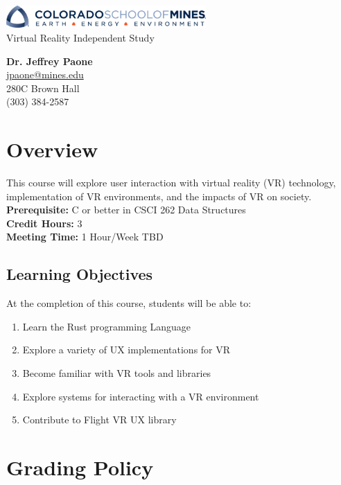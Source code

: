 \documentclass[11pt]{article}
\begin{document}
\begin{center}
    \includegraphics[width=3in]{logo-mines.png}
    \vspace{10mm}\\
    \LARGE Virtual Reality Independent Study
    \vspace{10mm}
\end{center}

\textbf{Dr. Jeffrey Paone} \\
\url{jpaone@mines.edu} \\
280C Brown Hall \\
(303) 384-2587

\section{Overview}
This course will explore user interaction with virtual reality (VR) technology,
implementation of VR environments, and the impacts of VR on society. \\

\textbf{Prerequisite:} C or better in CSCI 262 Data Structures \\
\textbf{Credit Hours:} 3 \\
\textbf{Meeting Time:} 1 Hour/Week TBD

\subsection{Learning Objectives}
At the completion of this course, students will be able to:
\begin{enumerate} \itemsep-0.4em
    \item Learn the Rust programming Language
    \item Explore a variety of UX implementations for VR
    \item Become familiar with VR tools and libraries
    \item Explore systems for interacting with a VR environment
    \item Contribute to Flight VR UX library
\end{enumerate}

\newpage
\section{Grading Policy}
\end{document}
